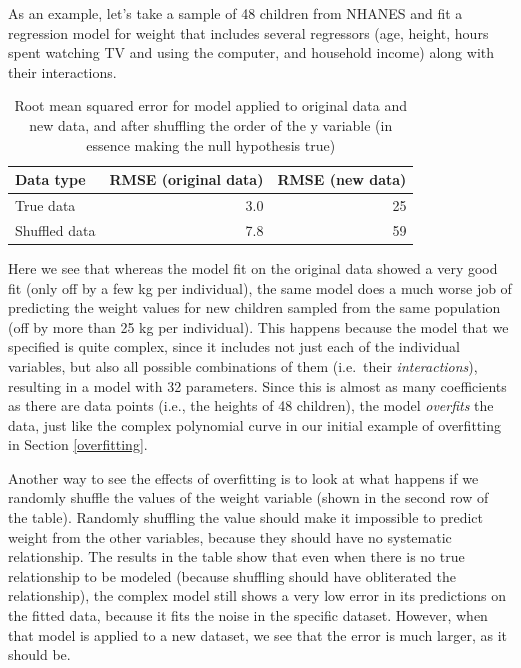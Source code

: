 \documentclass[12pt,]{book}
\theoremstyle{definition}
\theoremstyle{definition}
\theoremstyle{definition}
\theoremstyle{remark}
\begin{document}
As an example, let's take a sample of 48 children from NHANES and fit a regression model for weight that includes several regressors (age, height, hours spent watching TV and using the computer, and household income) along with their interactions.

\begin{table}

\caption{\label{tab:unnamed-chunk-87}Root mean squared error for model applied to original data and new data, and after shuffling the order of the y variable (in essence making the null hypothesis true)}
\centering
\begin{tabular}[t]{l|r|r}
\hline
Data type & RMSE (original data) & RMSE (new data)\\
\hline
True data & 3.0 & 25\\
\hline
Shuffled data & 7.8 & 59\\
\hline
\end{tabular}
\end{table}

Here we see that whereas the model fit on the original data showed a very good fit (only off by a few kg per individual), the same model does a much worse job of predicting the weight values for new children sampled from the same population (off by more than 25 kg per individual). This happens because the model that we specified is quite complex, since it includes not just each of the individual variables, but also all possible combinations of them (i.e.~their \emph{interactions}), resulting in a model with 32 parameters. Since this is almost as many coefficients as there are data points (i.e., the heights of 48 children), the model \emph{overfits} the data, just like the complex polynomial curve in our initial example of overfitting in Section \ref{overfitting}.

Another way to see the effects of overfitting is to look at what happens if we randomly shuffle the values of the weight variable (shown in the second row of the table). Randomly shuffling the value should make it impossible to predict weight from the other variables, because they should have no systematic relationship. The results in the table show that even when there is no true relationship to be modeled (because shuffling should have obliterated the relationship), the complex model still shows a very low error in its predictions on the fitted data, because it fits the noise in the specific dataset. However, when that model is applied to a new dataset, we see that the error is much larger, as it should be.
\end{document}
